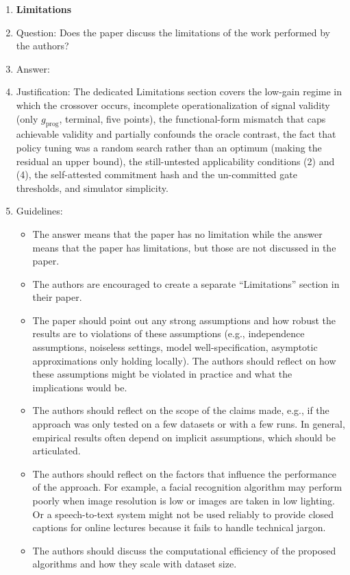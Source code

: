 \begin{enumerate}
\item {\bf Limitations}
    \item[] Question: Does the paper discuss the limitations of the work performed by the authors?
    \item[] Answer: \answerYes{}
    \item[] Justification: The dedicated Limitations section covers the low-gain regime in which the crossover occurs, incomplete operationalization of signal validity (only $g_{\text{prog}}$, terminal, five points), the functional-form mismatch that caps achievable validity and partially confounds the oracle contrast, the fact that policy tuning was a random search rather than an optimum (making the residual an upper bound), the still-untested applicability conditions (2) and (4), the self-attested commitment hash and the un-committed gate thresholds, and simulator simplicity.
    \item[] Guidelines:
    \begin{itemize}
        \item The answer \answerNA{} means that the paper has no limitation while the answer \answerNo{} means that the paper has limitations, but those are not discussed in the paper. 
        \item The authors are encouraged to create a separate ``Limitations'' section in their paper.
        \item The paper should point out any strong assumptions and how robust the results are to violations of these assumptions (e.g., independence assumptions, noiseless settings, model well-specification, asymptotic approximations only holding locally). The authors should reflect on how these assumptions might be violated in practice and what the implications would be.
        \item The authors should reflect on the scope of the claims made, e.g., if the approach was only tested on a few datasets or with a few runs. In general, empirical results often depend on implicit assumptions, which should be articulated.
        \item The authors should reflect on the factors that influence the performance of the approach. For example, a facial recognition algorithm may perform poorly when image resolution is low or images are taken in low lighting. Or a speech-to-text system might not be used reliably to provide closed captions for online lectures because it fails to handle technical jargon.
        \item The authors should discuss the computational efficiency of the proposed algorithms and how they scale with dataset size.

\end{itemize}
\end{enumerate}
